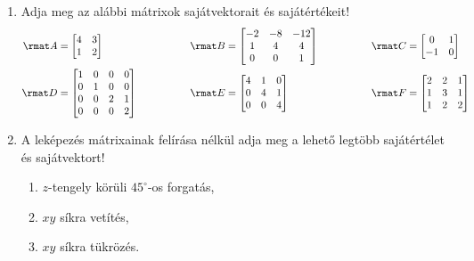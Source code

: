 \documentclass[a4paper, 12pt]{scrartcl}
\begin{document}
\begin{enumerate}
  \item Adja meg az alábbi mátrixok sajátvektorait és sajátértékeit!
        \begin{alignat*}{9}
          \rmat A & =
          \begin{bmatrix}
            4 & 3 \\
            1 & 2
          \end{bmatrix}
                  & \rmat B & =
          \begin{bmatrix}
            -2 & -8 & -12 \\
            1  & 4  & 4   \\
            0  & 0  & 1
          \end{bmatrix}
          \hspace{15mm}
                  & \rmat C & =
          \begin{bmatrix}
            0  & 1 \\
            -1 & 0
          \end{bmatrix}
          \\
          \rmat D & =
          \begin{bmatrix}
            1 & 0 & 0 & 0 \\
            0 & 1 & 0 & 0 \\
            0 & 0 & 2 & 1 \\
            0 & 0 & 0 & 2
          \end{bmatrix}
          \hspace{15mm}
                  & \rmat E & =
          \begin{bmatrix}
            4 & 1 & 0 \\
            0 & 4 & 1 \\
            0 & 0 & 4
          \end{bmatrix}
                  & \rmat F & =
          \begin{bmatrix}
            2 & 2 & 1 \\
            1 & 3 & 1 \\
            1 & 2 & 2
          \end{bmatrix}
        \end{alignat*}

  \item A leképezés mátrixainak felírása nélkül adja meg a lehető legtöbb
        sajátértélet és sajátvektort!
        \begin{enumerate}
          \item $z$-tengely körüli $45^\circ$-os forgatás,
          \item $xy$ síkra vetítés,
          \item $xy$ síkra tükrözés.
        \end{enumerate}


\end{enumerate}
\end{document}

